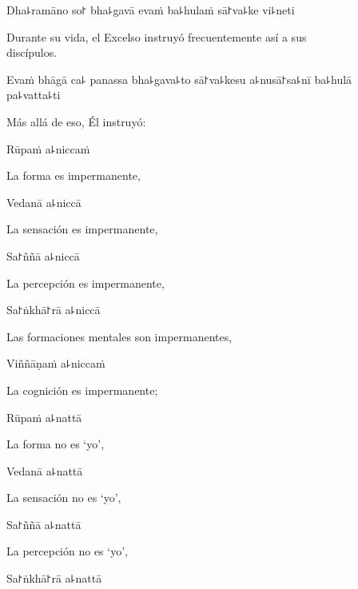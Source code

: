 Dha꜕ramāno so꜓ bha꜕gavā evaṁ ba꜕hulaṁ sā꜓va꜕ke vi꜕neti

\begin{english}
  Durante su vida, el Excelso instruyó frecuentemente así a sus\\ discípulos.
\end{english}

Evaṁ bhāgā ca꜕ panassa bha꜕gava꜕to sā꜓va꜕kesu a꜕nusā꜓sa꜕nī ba꜕hulā pa꜕vatta꜕ti

\begin{english}
  Más allá de eso, Él instruyó:
\end{english}


Rūpaṁ a꜕niccaṁ

\begin{english}
  La forma es impermanente,
\end{english}

Vedanā a꜕niccā

\begin{english}
  La sensación es impermanente,
\end{english}

Sa꜓ññā a꜕niccā

\begin{english}
  La percepción es impermanente,
\end{english}

Sa꜓ṅkhā꜓rā a꜕niccā

\begin{english}
  Las formaciones mentales son impermanentes,
\end{english}

Viññāṇaṁ a꜕niccaṁ

\begin{english}
  La cognición es impermanente;
\end{english}

Rūpaṁ a꜕nattā

\begin{english}
  La forma no es ‘yo’,
\end{english}

Vedanā a꜕nattā

\begin{english}
  La sensación no es ‘yo’,
\end{english}

Sa꜓ññā a꜕nattā

\begin{english}
  La percepción no es ‘yo’,
\end{english}

Sa꜓ṅkhā꜓rā a꜕nattā


